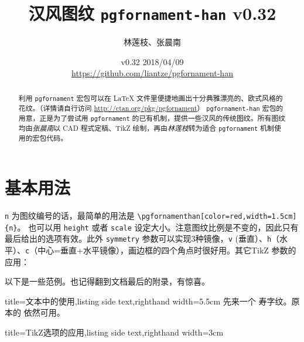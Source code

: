 \documentclass[fontset=fandol]{ctexart}
\title{汉风图纹 \texttt{pgfornament-han} v0.32}
\author{林莲枝、张晨南}
\date{v0.32 2018/04/09\\\url{https://github.com/liantze/pgfornament-han}}
\newcommand{\latexinline}[1]{\lstinline|#1|}
\begin{document}
\maketitle

\begin{abstract}
利用 \texttt{pgfornament} 宏包可以在 \LaTeX{} 文件里便捷地画出十分典雅漂亮的、欧式风格的花纹。（详情请自行访问 \url{http://ctan.org/pkg/pgfornament}）
 \texttt{pgfornament-han} 宏包的用意，正是为了尝试用 \texttt{pgfornament} 的已有机制，提供一些汉风的传统图纹。所有图纹均由\emph{张晨南}以 CAD 程式定稿、TikZ 绘制，再由\emph{林莲枝}转为适合 \texttt{pgfornament} 机制使用的宏包代码。
\end{abstract}

\part{基本用法}

\texttt{n} 为图纹编号的话，最简单的用法是 \latexinline{\pgfornamenthan[color=red,width=1.5cm]{n}}。
也可以用 \texttt{height} 或者 \texttt{scale} 设定大小。注意图纹比例是不变的，因此只有最后给出的选项有效。此外 \texttt{symmetry} 参数可以实现3种镜像，\texttt{v} (垂直）、\texttt{h}（水平）、\texttt{c}（中心=垂直+水平镜像），画边框的四个角点时很好用。其它TikZ 参数的应用：

\begin{latexcode}
\end{latexcode}

以下是一些范例。也记得翻到文档最后的附录，有惊喜。

\bigskip

\begin{tcblisting}{title={文本中的使用},listing side text,righthand width=5.5cm}
先来一个 
寿字纹。原本的  依然可用。
\end{tcblisting}

\enlargethispage{\baselineskip}


\begin{tcblisting}{title={TikZ选项的应用},listing side text,righthand width=3cm}
\end{tcblisting}
\end{document}
